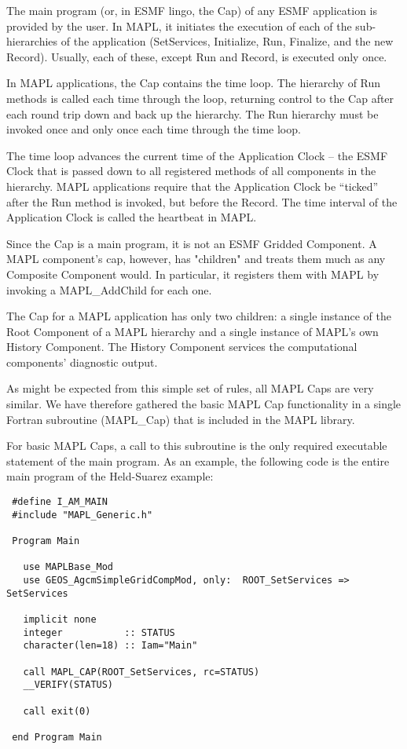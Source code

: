 
 The main program (or, in ESMF lingo, the Cap) of any ESMF application is 
 provided by the user. In MAPL, it initiates the execution of each of the
 sub-hierarchies of the application (SetServices, Initialize, Run,
 Finalize, and the new Record). Usually, each of these, except Run and Record,
 is executed only once.
 
 In MAPL applications, the Cap contains the time loop.
 The hierarchy of Run methods is called each time through the loop,
 returning control to the Cap after each round trip down and back up
 the hierarchy. The Run hierarchy must be invoked once and only once
 each time through the time loop.
 
 The time loop advances the current time of the Application Clock -- the ESMF
 Clock that is passed down to all registered methods of all components in
 the hierarchy. MAPL applications require that the Application Clock be
 ``ticked'' after the Run method is invoked, but before the Record.
 The time interval of the Application Clock is called the heartbeat in MAPL.
 
 
 Since the Cap is a main program, it is not an ESMF Gridded Component.
 A MAPL component's cap, however, has "children" and treats them much
 as any Composite Component would. In particular, it registers them with
 MAPL by invoking a MAPL\_AddChild for each one.
 
 The Cap for a MAPL application has only two children: a single instance
 of the Root Component of a MAPL hierarchy and a single instance of MAPL's
 own History Component. The History Component services the computational
 components' diagnostic output.
 
 As might be expected from this simple set of rules, all MAPL Caps are
 very similar. We have therefore gathered the basic MAPL Cap functionality
 in a single Fortran subroutine (MAPL\_Cap) that is included in the
 MAPL library.

 For basic MAPL Caps, a call to this subroutine is the only required
 executable statement of the main program. As an example, the following code
 is the entire main program of the Held-Suarez example:
 \begin{verbatim}
 #define I_AM_MAIN
 #include "MAPL_Generic.h"

 Program Main

   use MAPLBase_Mod
   use GEOS_AgcmSimpleGridCompMod, only:  ROOT_SetServices => SetServices

   implicit none
   integer           :: STATUS
   character(len=18) :: Iam="Main"

   call MAPL_CAP(ROOT_SetServices, rc=STATUS)
   __VERIFY(STATUS)

   call exit(0)

 end Program Main
 \end{verbatim}
 
